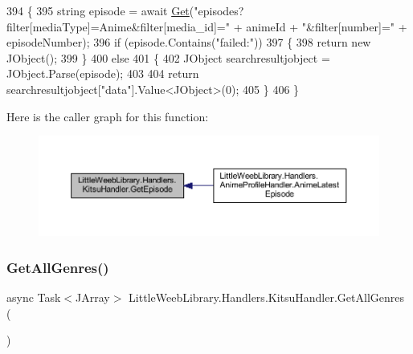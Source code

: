 \begin{DoxyCode}
394         \{
395             \textcolor{keywordtype}{string} episode = await \mbox{\hyperlink{class_little_weeb_library_1_1_handlers_1_1_kitsu_handler_a8b7c629a03096c3152252f6b5cf2937f}{Get}}(\textcolor{stringliteral}{"episodes?filter[mediaType]=Anime&filter[media\_id]="} + animeId + \textcolor{stringliteral}{
      "&filter[number]="} + episodeNumber);
396             \textcolor{keywordflow}{if} (episode.Contains(\textcolor{stringliteral}{"failed:"}))
397             \{
398                 \textcolor{keywordflow}{return} \textcolor{keyword}{new} JObject();
399             \}
400             \textcolor{keywordflow}{else}
401             \{
402                 JObject searchresultjobject = JObject.Parse(episode);
403 
404                 \textcolor{keywordflow}{return} searchresultjobject[\textcolor{stringliteral}{"data"}].Value<JObject>(0);
405             \}
406         \}
\end{DoxyCode}
Here is the caller graph for this function\+:\nopagebreak
\begin{figure}[H]
\begin{center}
\leavevmode
\includegraphics[width=350pt]{class_little_weeb_library_1_1_handlers_1_1_kitsu_handler_a3129d77267b0fb879e3f8f1a8e83494a_icgraph}
\end{center}
\end{figure}
\mbox{\label{class_little_weeb_library_1_1_handlers_1_1_kitsu_handler_a528491d8d97584b2ba2c3bfcc4b5772e}} 
\subsubsection{\texorpdfstring{Get\+All\+Genres()}{GetAllGenres()}}
{\footnotesize\ttfamily async Task$<$J\+Array$>$ Little\+Weeb\+Library.\+Handlers.\+Kitsu\+Handler.\+Get\+All\+Genres (\begin{DoxyParamCaption}{ }\end{DoxyParamCaption})}



